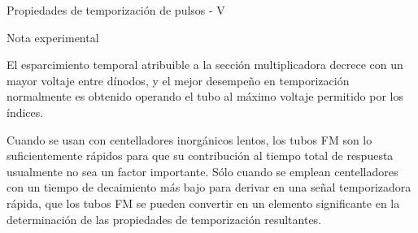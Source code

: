 \documentclass[a4paper,10pt]{beamer}
\begin{document}
\begin{frame}{Propiedades de temporización de pulsos - V}
\begin{exampleblock}{Nota experimental}
 \begin{justify}
 El esparcimiento temporal atribuible a la sección multiplicadora decrece con un 
 mayor voltaje entre dínodos, y el mejor desempeño en temporización normalmente es 
 obtenido operando el tubo al máximo voltaje permitido por los índices.
 
 \vspace{.3cm}
 
 Cuando se usan con centelladores inorgánicos lentos, los tubos FM son lo suficientemente
 rápidos para que su contribución al tiempo total de respuesta usualmente no sea 
 un factor importante. Sólo cuando se emplean centelladores con un tiempo de 
 decaimiento más bajo para derivar en una señal temporizadora rápida, que 
 los tubos FM se pueden convertir en un elemento significante en la determinación 
 de las propiedades de temporización resultantes.
 
 \end{justify}
\end{exampleblock}
 \end{frame}
 
\end{document}
